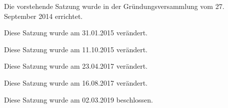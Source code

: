 \documentclass[11pt,a4paper,twoside,openany,article]{memoir}
\begin{document}
\begin{changes}
\item Die vorstehende Satzung wurde in der Gründungsversammlung vom 27. September 2014 errichtet.
\item Diese Satzung wurde am 31.01.2015 verändert.
\item Diese Satzung wurde am 11.10.2015 verändert.
\item Diese Satzung wurde am 23.04.2017 verändert.
\item Diese Satzung wurde am 16.08.2017 verändert.
\item Diese Satzung wurde am 02.03.2019 beschlossen.
\end{changes}
\end{document}
